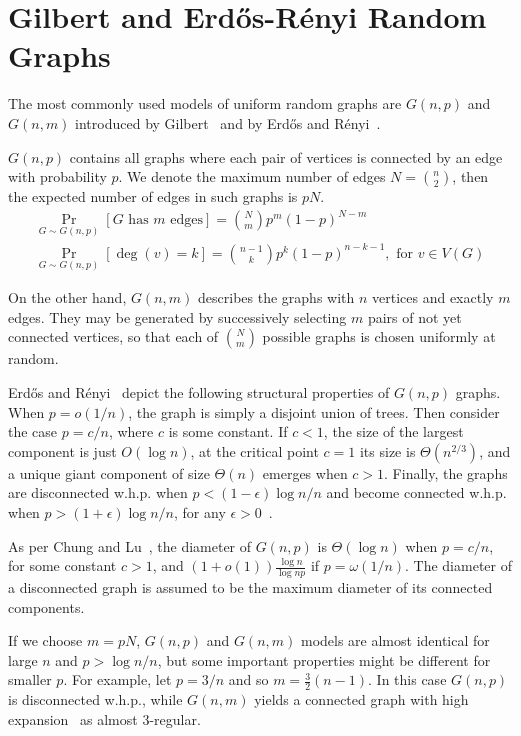 \section{Gilbert and \texorpdfstring{Erd\H{o}s-R\'enyi}{Erdos-Renyi} Random Graphs}

The most commonly used models of uniform random graphs are $G(n,p)$ and $G(n,m)$
introduced by Gilbert~\cite{gil59} and by Erd\H{o}s and R\'enyi~\cite{er59}.

$G(n,p)$ contains all graphs where each pair of vertices
is connected by an edge with probability $p$.
We denote the maximum number of edges $N=\binom{n}{2}$,
then the expected number of edges in such graphs is $pN$.
\begin{gather}
    \Pr_{G\sim G(n,p)}[G\text{ has }m\text{ edges}]=\binom{N}{m}p^m(1-p)^{N-m}\\
    \Pr_{G\sim G(n,p)}[\deg(v)=k]=\binom{n-1}{k}p^k(1-p)^{n-k-1},\text{ for }v\in V(G)
\end{gather}

On the other hand, $G(n,m)$ describes the graphs with $n$ vertices and exactly $m$ edges.
They may be generated by successively selecting $m$ pairs of not yet connected vertices,
so that each of $\binom{N}{m}$ possible graphs is chosen uniformly at random.

Erd\H{o}s and R\'enyi~\cite{er60} depict the following structural properties of $G(n,p)$ graphs.
When $p=o(1/n)$, the graph is simply a disjoint union of trees.
Then consider the case $p=c/n$, where $c$ is some constant.
If $c<1$, the size of the largest component is just $O(\log n)$,
at the critical point $c=1$ its size is $\Theta\left(n^{2/3}\right)$,
and a unique giant component of size $\Theta(n)$ emerges when $c>1$.
Finally, the graphs are disconnected  w.h.p. when $p<(1-\epsilon)\log n/n$
and become connected w.h.p. when $p>(1+\epsilon)\log n/n$, for any $\epsilon>0$~\cite{er59}.

As per Chung and Lu~\cite{cl01,cl04}, the diameter of $G(n,p)$ is
$\Theta(\log n)$ when $p=c/n$, for some constant $c>1$,
and $(1+o(1))\frac{\log n}{\log np}$ if $p=\omega(1/n)$.
The diameter of a disconnected graph is assumed to be the maximum
diameter of its connected components.


If we choose $m=pN$, $G(n,p)$ and $G(n,m)$ models are almost identical for large $n$
and $p>\log n/n$, but some important properties might be different for smaller $p$.
For example, let $p=3/n$ and so $m=\frac{3}{2}(n-1)$.
In this case $G(n,p)$ is disconnected w.h.p., while $G(n,m)$ yields
a connected graph with high expansion~\cite{mah09} as almost 3-regular.

